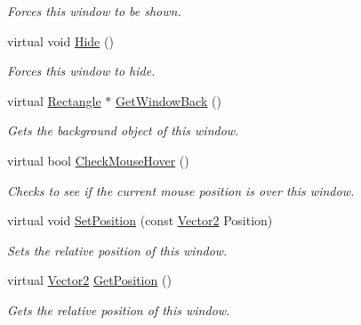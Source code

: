 \begin{DoxyCompactItemize}
\begin{DoxyCompactList}\small\item\em Forces this window to be shown. \item\end{DoxyCompactList}\item 
\hypertarget{classphys_1_1UI_1_1Window_a5eb51c6e1b2c440b52196fcf1022285e}{
virtual void \hyperlink{classphys_1_1UI_1_1Window_a5eb51c6e1b2c440b52196fcf1022285e}{Hide} ()}
\label{d4/d86/classphys_1_1UI_1_1Window_a5eb51c6e1b2c440b52196fcf1022285e}

\begin{DoxyCompactList}\small\item\em Forces this window to hide. \item\end{DoxyCompactList}\item 
virtual \hyperlink{classphys_1_1UI_1_1Rectangle}{Rectangle} $\ast$ \hyperlink{classphys_1_1UI_1_1Window_af06ae5666145e4d8835b38f4a9cbca2a}{GetWindowBack} ()
\begin{DoxyCompactList}\small\item\em Gets the background object of this window. \item\end{DoxyCompactList}\item 
virtual bool \hyperlink{classphys_1_1UI_1_1Window_a771bc9e43c0492ab179d8126c30665cf}{CheckMouseHover} ()
\begin{DoxyCompactList}\small\item\em Checks to see if the current mouse position is over this window. \item\end{DoxyCompactList}\item 
virtual void \hyperlink{classphys_1_1UI_1_1Window_a66babe97151763b445e8920c5c231985}{SetPosition} (const \hyperlink{classphys_1_1Vector2}{Vector2} Position)
\begin{DoxyCompactList}\small\item\em Sets the relative position of this window. \item\end{DoxyCompactList}\item 
virtual \hyperlink{classphys_1_1Vector2}{Vector2} \hyperlink{classphys_1_1UI_1_1Window_a29fca96d9a2dab29d77a36d6a329f306}{GetPosition} ()
\begin{DoxyCompactList}\small\item\em Gets the relative position of this window. \item\end{DoxyCompactList}\item 

\end{DoxyCompactItemize}
